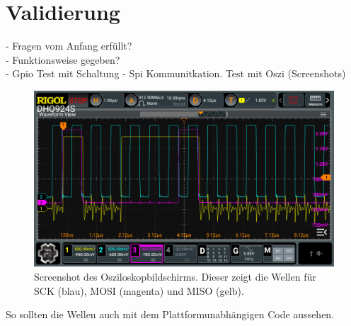\section{Validierung}

- Fragen vom Anfang erfüllt?\\

- Funktionsweise gegeben?\\
- Gpio Test mit Schaltung
- Spi Kommunitkation. Test mit Oszi (Screenshots)



\begin{figure}[H]
	\includegraphics[width=\textwidth]{Pics/oszi_cube_spi_example.png}
	\caption{Screenshot des Osziloskopbildschirms. Dieser zeigt die Wellen für SCK (blau), MOSI (magenta) und MISO (gelb).}
	\label{fig:oszi_cube_spi_example}
\end{figure}

So sollten die Wellen auch mit dem Plattformunabhängigen Code aussehen.

